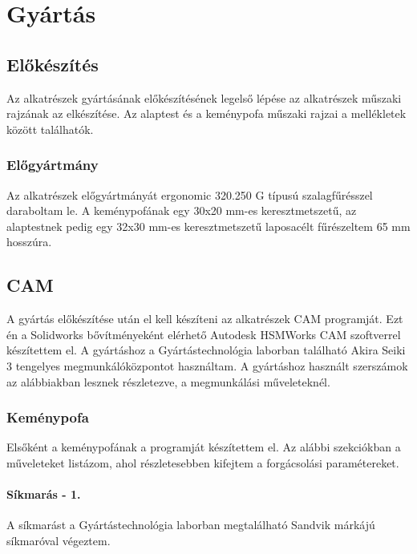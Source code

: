 \documentclass[12pt,a4paper,oneside]{report}
\begin{document}
\chapter{Gyártás}
\section{Előkészítés}
Az alkatrészek gyártásának előkészítésének legelső lépése az alkatrészek műszaki rajzának az elkészítése. Az alaptest és a keménypofa műszaki rajzai a mellékletek között találhatók.
\subsection{Előgyártmány}
Az alkatrészek előgyártmányát ergonomic 320.250 G típusú szalagfűrésszel daraboltam le. A keménypofának egy 30x20 mm-es keresztmetszetű, az alaptestnek pedig egy 32x30 mm-es keresztmetszetű laposacélt fűrészeltem 65 mm hosszúra.

\section{CAM}
A gyártás előkészítése után el kell készíteni az alkatrészek CAM programját. Ezt én a Solidworks bővítményeként elérhető Autodesk HSMWorks CAM szoftverrel készítettem el. A gyártáshoz a Gyártástechnológia laborban található Akira Seiki 3 tengelyes megmunkálóközpontot használtam. A gyártáshoz használt szerszámok az alábbiakban lesznek részletezve, a megmunkálási műveleteknél.
\subsection{Keménypofa}
Elsőként a keménypofának a programját készítettem el. Az alábbi szekciókban a műveleteket listázom, ahol részletesebben kifejtem a forgácsolási paramétereket.

\subsubsection{Síkmarás - 1.}
A síkmarást a Gyártástechnológia laborban megtalálható Sandvik márkájú síkmaróval végeztem.
\end{document}
